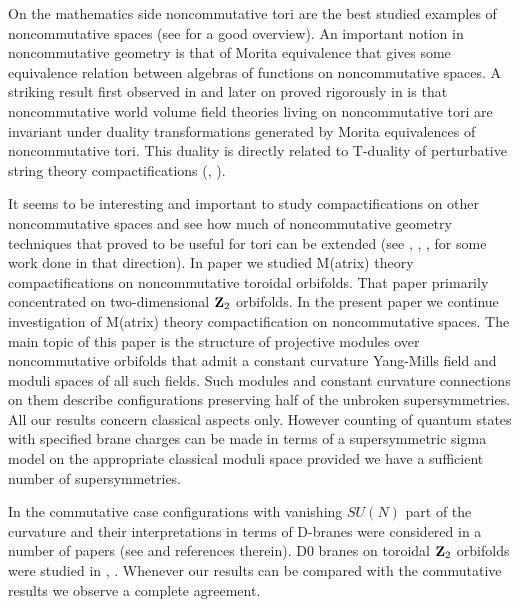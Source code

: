 \documentclass[a4paper,a4paper]{article}
\begin{document}
On the mathematics side noncommutative tori are the best studied examples of noncommutative spaces 
(see \cite{Rieffel1} for a good overview). An important notion in noncommutative geometry is that of 
Morita equivalence that gives some equivalence relation between algebras of functions on noncommutative spaces. 
A striking result first observed in \cite{CDS} and later on proved rigorously in \cite{ASMorita} is 
that noncommutative world volume field theories living on noncommutative tori are invariant under 
duality transformations generated by Morita equivalences of noncommutative tori. This duality 
is directly related to T-duality of perturbative string theory compactifications  (\cite{ASRieffel}, \cite{SeibWitt}).  


It seems to be    interesting and important to study compactifications on other noncommutative spaces and see 
how much of noncommutative geometry  techniques that proved to be useful for tori can be extended (see \cite{HoWu}, \cite{HoWu2}, 
\cite{ncRS}, \cite{z2} for some work done in that direction). 
In paper \cite{z2} 
we  studied  M(atrix) theory compactifications on noncommutative toroidal orbifolds.  
That paper primarily concentrated on 
 two-dimensional  ${\bf Z}_{2}$ orbifolds. 
In the present paper we continue  investigation of  M(atrix) theory compactification on noncommutative spaces.
The main topic of this paper is the structure of projective modules over noncommutative orbifolds that admit a  
constant curvature 
Yang-Mills field  and moduli spaces of all such fields. Such modules and constant curvature connections 
on them describe configurations preserving half of the unbroken supersymmetries. 
 All our results concern classical aspects only. However  counting of quantum states 
with specified brane charges can be made in terms of a supersymmetric sigma model on the appropriate classical 
moduli space provided we have a sufficient number of supersymmetries. 


In the commutative case configurations with vanishing $SU(N)$ part of the curvature and their interpretations 
in terms of D-branes were considered in a number of papers (see \cite{GurRamg}  and references 
therein). D0 branes on toroidal ${\bf Z}_{2}$ orbifolds were studied in \cite{RamgWald}, \cite{GLY}. 
Whenever our results can be compared with the commutative results we observe a complete agreement.
\end{document}
